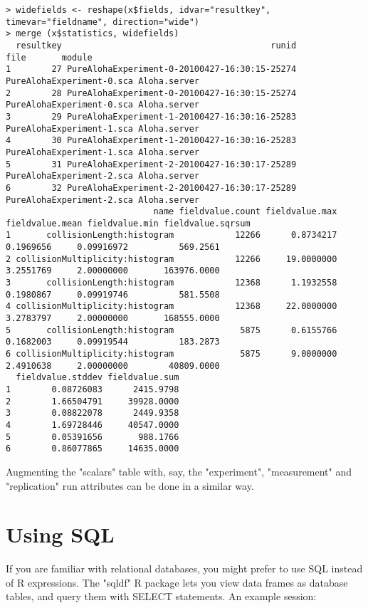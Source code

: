 \begin{verbatim}
> widefields <- reshape(x$fields, idvar="resultkey", timevar="fieldname", direction="wide")
> merge (x$statistics, widefields)
  resultkey                                         runid                      file       module
1        27 PureAlohaExperiment-0-20100427-16:30:15-25274 PureAlohaExperiment-0.sca Aloha.server
2        28 PureAlohaExperiment-0-20100427-16:30:15-25274 PureAlohaExperiment-0.sca Aloha.server
3        29 PureAlohaExperiment-1-20100427-16:30:16-25283 PureAlohaExperiment-1.sca Aloha.server
4        30 PureAlohaExperiment-1-20100427-16:30:16-25283 PureAlohaExperiment-1.sca Aloha.server
5        31 PureAlohaExperiment-2-20100427-16:30:17-25289 PureAlohaExperiment-2.sca Aloha.server
6        32 PureAlohaExperiment-2-20100427-16:30:17-25289 PureAlohaExperiment-2.sca Aloha.server
                             name fieldvalue.count fieldvalue.max fieldvalue.mean fieldvalue.min fieldvalue.sqrsum
1       collisionLength:histogram            12266      0.8734217       0.1969656     0.09916972          569.2561
2 collisionMultiplicity:histogram            12266     19.0000000       3.2551769     2.00000000       163976.0000
3       collisionLength:histogram            12368      1.1932558       0.1980867     0.09919746          581.5508
4 collisionMultiplicity:histogram            12368     22.0000000       3.2783797     2.00000000       168555.0000
5       collisionLength:histogram             5875      0.6155766       0.1682003     0.09919544          183.2873
6 collisionMultiplicity:histogram             5875      9.0000000       2.4910638     2.00000000        40809.0000
  fieldvalue.stddev fieldvalue.sum
1        0.08726083      2415.9798
2        1.66504791     39928.0000
3        0.08822078      2449.9358
4        1.69728446     40547.0000
5        0.05391656       988.1766
6        0.86077865     14635.0000
\end{verbatim}

Augmenting the "scalars" table with, say, the "experiment", "measurement" and "replication"
run attributes can be done in a similar way.


\section{Using SQL}

If you are familiar with relational databases, you might prefer to use SQL instead of
R expressions. The "sqldf" R package lets you view data frames as database tables,
and query them with SELECT statements. An example session:

